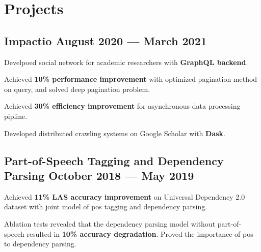 \section{Projects}



\subsection*{Impactio \hfill August 2020 --- March 2021} 
    \begin{zitemize}
        \item Develpoed social network for academic researchers with \textbf{GraphQL backend}.
        \item Achieved \textbf{10\% performance improvement} with optimized pagination method on query, and solved deep pagination problem.
        \item Achieved \textbf{30\% efficiency improvement} for asynchronous data processing pipline.
        \item Developed distributed crawling systems on Google Scholar with \textbf{Dask}.
    \end{zitemize}


\subsection*{Part-of-Speech Tagging and Dependency Parsing \hfill October 2018 --- May 2019} 
    \begin{zitemize}
        \item Achieved \textbf{11\% LAS accuracy improvement} on Universal Dependency 2.0 dataset with joint model of pos tagging and dependency parsing.
        \item Ablation tests revealed that the dependency parsing model without part-of-speech resulted in \textbf{10\% accuracy degradation}. Proved the importance of pos to dependency parsing.
    \end{zitemize}


